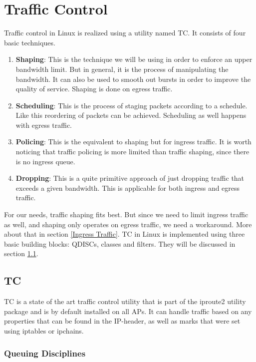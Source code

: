 \chapter{Traffic Control}
Traffic control in Linux is realized using a utility named \acs{TC}. It consists of four basic techniques.

\begin{enumerate}
\item \textbf{Shaping}: This is the technique we will be using in order to enforce an upper bandwidth limit. But in general, it is the process of manipulating the bandwidth. It can also be used to smooth out bursts in order to improve the quality of service. Shaping is done on egress traffic.

\item \textbf{Scheduling}: This is the process of staging packets according to a schedule. Like this reordering of packets can be achieved. Scheduling as well happens with egress traffic.

\item \textbf{Policing}: This is the equivalent to shaping but for ingress traffic. It is worth noticing that traffic policing is more limited than traffic shaping, since there is no ingress queue.

\item \textbf{Dropping}: This is a quite primitive approach of just dropping traffic that exceeds a given bandwidth. This is applicable for both ingress and egress traffic.
\end{enumerate}

For our needs, traffic shaping fits best. But since we need to limit ingress traffic as well, and shaping only operates on egress traffic, we need a workaround. More about that in section  \ref{Ingress Traffic}. \acl{TC} in Linux is implemented using three basic building blocks: \acp{QDISC}, classes and filters. They will be discussed in section \ref{TC}.

\newpage
\section{TC} \label{TC}
\acs{TC} is a state of the art traffic control utility that is part of the iproute2 utility package and is by default installed on all \aclp{AP}. It can handle traffic based on any properties that can be found in the \acs{IP}-header, as well as marks that were set using iptables or ipchains.

\subsection{Queuing Disciplines}

